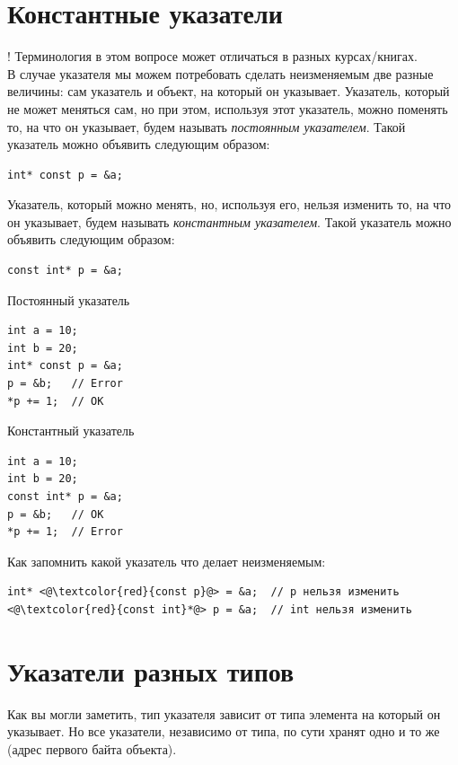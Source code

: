 \documentclass{article}
\begin{document}
\newpage
\section*{Константные указатели}
! Терминология в этом вопросе может отличаться в разных курсах/книгах.\\

В случае указателя мы можем потребовать сделать неизменяемым две разные величины: сам указатель и объект, на который он указывает. 
Указатель, который не может меняться сам, но при этом, используя этот указатель, можно поменять то, на что он указывает, будем называть \textit{постоянным указателем}. Такой указатель можно объявить следующим образом:
\begin{lstlisting}
int* const p = &a;
\end{lstlisting}

Указатель, который можно менять, но, используя его, нельзя изменить то, на что он указывает, будем называть \textit{константным указателем}. Такой указатель можно объявить следующим образом:
\begin{lstlisting}
const int* p = &a;
\end{lstlisting}

\begin{multicols}{2}
Постоянный указатель
\begin{lstlisting}
int a = 10;
int b = 20;
int* const p = &a;
p = &b;   // Error
*p += 1;  // OK
\end{lstlisting}

Константный указатель
\begin{lstlisting}
int a = 10;
int b = 20;
const int* p = &a;
p = &b;   // OK
*p += 1;  // Error
\end{lstlisting}
\end{multicols}

Как запомнить какой указатель что делает неизменяемым:
\begin{lstlisting}
int* <@\textcolor{red}{const p}@> = &a;  // p нельзя изменить
<@\textcolor{red}{const int}*@> p = &a;  // int нельзя изменить
\end{lstlisting}


\section*{Указатели разных типов}
Как вы могли заметить, тип указателя зависит от типа элемента на который он указывает. Но все указатели, независимо от типа, по сути хранят одно и то же (адрес первого байта объекта). 
\end{document}
